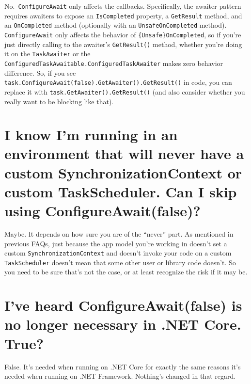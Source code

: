 \documentclass[a4paper,12pt,notitlepage,twoside,openright]{article}
\begin{document}
No.~\texttt{ConfigureAwait} only affects the callbacks. Specifically,
the awaiter pattern requires awaiters to expose an \texttt{IsCompleted}
property, a \texttt{GetResult} method, and an \texttt{OnCompleted}
method (optionally with an \texttt{UnsafeOnCompleted} method).
\texttt{ConfigureAwait} only affects the behavior of
\texttt{\{Unsafe\}OnCompleted}, so if you're just directly calling to
the awaiter's \texttt{GetResult()} method, whether you're doing it on
the \texttt{TaskAwaiter} or the
\texttt{ConfiguredTaskAwaitable.ConfiguredTaskAwaiter} makes zero
behavior difference. So, if you see
\texttt{task.ConfigureAwait(false).GetAwaiter().GetResult()} in code,
you can replace it with \texttt{task.GetAwaiter().GetResult()} (and also
consider whether you really want to be blocking like that).

\hypertarget{i-know-im-running-in-an-environment-that-will-never-have-a-custom-synchronizationcontext-or-custom-taskscheduler.-can-i-skip-using-configureawaitfalse}{%
\section{I know I'm running in an environment that will never have a
custom SynchronizationContext or custom TaskScheduler. Can I skip using
ConfigureAwait(false)?}\label{i-know-im-running-in-an-environment-that-will-never-have-a-custom-synchronizationcontext-or-custom-taskscheduler.-can-i-skip-using-configureawaitfalse}}

Maybe. It depends on how sure you are of the ``never'' part. As
mentioned in previous FAQs, just because the app model you're working in
doesn't set a custom \texttt{SynchronizationContext} and doesn't invoke
your code on a custom \texttt{TaskScheduler} doesn't mean that some
other user or library code doesn't. So you need to be sure that's not
the case, or at least recognize the risk if it may be.

\hypertarget{ive-heard-configureawaitfalse-is-no-longer-necessary-in-.net-core.-true}{%
\section{I've heard ConfigureAwait(false) is no longer necessary in
.NET Core.
True?}\label{ive-heard-configureawaitfalse-is-no-longer-necessary-in-.net-core.-true}}

False. It's needed when running on .NET Core for exactly the same
reasons it's needed when running on .NET Framework. Nothing's changed in
that regard.
\end{document}
